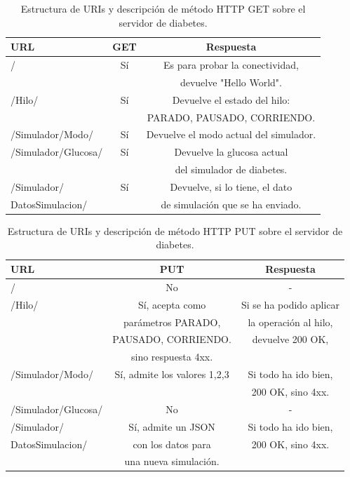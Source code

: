 \documentclass[12pt,spanish,listoffigures,listoftables]{tfgetsinf}
\begin{document}
\begin{table}[!h]
\begin{center}
\begin{tabular}{|l|c|c|}
	\hline 
	\textbf{URL} & \textbf{GET} & \textbf{Respuesta}\\ 
	\hline 
	/ & Sí & Es para probar la conectividad, \\ 
	&& devuelve "Hello World".\\
	\hline 
	/Hilo/ & Sí & Devuelve el estado del hilo:\\ 
	&& PARADO, PAUSADO, CORRIENDO. \\
	\hline 
	/Simulador/Modo/ & Sí & Devuelve el modo actual del simulador.\\ 
	\hline 
	/Simulador/Glucosa/ & Sí & Devuelve la glucosa actual\\ 
	&& del simulador de diabetes.\\
	\hline 
	/Simulador/ & Sí & Devuelve, si lo tiene, el dato\\ 
	DatosSimulacion/&& de simulación que se ha enviado.\\
	\hline 
\end{tabular} 
\caption{Estructura de URIs y descripción de método HTTP GET sobre el servidor de diabetes.}
\label{tabla:urishttpget}
\end{center}
\end{table}

\begin{table}[!h]
	\begin{center}
		\begin{tabular}{|l|c|c|}
			\hline 
			\textbf{URL} & \textbf{PUT} & \textbf{Respuesta} \\ 
			\hline 
			/ & No & - \\ 
			\hline 
			/Hilo/ & Sí, acepta como & Si se ha podido aplicar  \\ 
			& parámetros PARADO, & la operación al hilo,\\
			& PAUSADO, CORRIENDO. & devuelve 200 OK,\\
			& sino respuesta 4xx. & \\
			\hline 
			/Simulador/Modo/ & Sí, admite los valores 1,2,3 & Si todo ha ido bien,\\ 
			&& 200 OK, sino 4xx. \\
			\hline 
			/Simulador/Glucosa/ & No & - \\ 
			\hline 
			/Simulador/ & Sí, admite un JSON & Si todo ha ido bien, \\ 
			DatosSimulacion/ & con los datos para & 200 OK, sino 4xx.\\
			& una nueva simulación. & \\
			\hline 
		\end{tabular} 
		\caption{Estructura de URIs y descripción de método HTTP PUT sobre el servidor de diabetes.}
		\label{tabla:urishttpput}
	\end{center}
\end{table}
\end{document}

